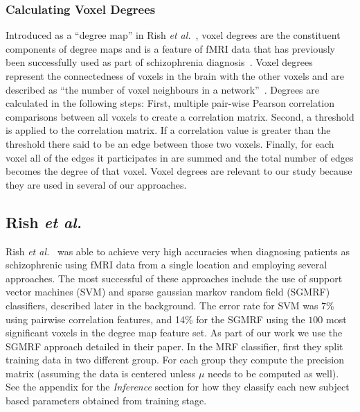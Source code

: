 \documentclass{article} %
\begin{document}
\subsubsection{Calculating Voxel Degrees}
Introduced as a ``degree map'' in Rish 
\emph{et al.}~\cite{rish2009discriminative}, voxel degrees are the constituent
components of degree maps and is a feature of fMRI data that has previously
been successfully used as part of schizophrenia diagnosis~\cite{Rish_2013}.
Voxel degrees represent the connectedness of voxels in the brain with the 
other voxels and are described as ``the number of voxel neighbours in a 
network''~\cite{Rish_2013}. Degrees are calculated in the following steps:
First, multiple pair-wise Pearson correlation comparisons between all voxels to 
create a correlation matrix. Second, a threshold is applied to the correlation
matrix. If a correlation value is greater than the threshold there said to be
an edge between those two voxels. Finally, for each voxel all of the edges
it participates in are summed and the total number of edges becomes the 
degree of that voxel. Voxel degrees are relevant to our study because they
are used in several of our approaches.

\subsection{Rish \emph{et al.}}
Rish \emph{et al.}~\cite{Rish_2013} was able to achieve very high accuracies 
when diagnosing patients as schizophrenic using fMRI data from a 
single location and employing several approaches. The most successful of these
approaches include the use of support vector machines (SVM) and sparse 
gaussian markov random field (SGMRF) classifiers, described later in the 
background. The error rate for SVM was 7\% using pairwise correlation features, 
and 14\% for the SGMRF using the $100$ most significant voxels in the 
degree map feature set. As part of our work we use the SGMRF approach
detailed in their paper. In the MRF classifier, first they split training data 
in two different group. For each group they compute the precision matrix 
(assuming the data is centered unless $\mu$ needs to be computed as well). 
See the appendix for the \textit{Inference} section for how they classify each 
new subject based parameters obtained from training stage.

%
\end{document}
